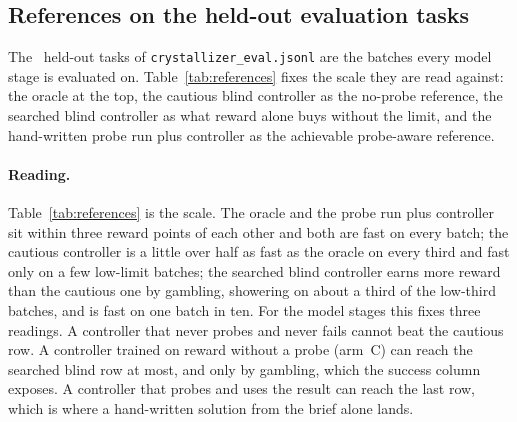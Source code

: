 \documentclass[11pt,a4paper]{article}
\begin{document}
\subsection{References on the held-out evaluation tasks}
\label{sec:references}

The \SZneval\ held-out tasks of \texttt{crystallizer\_eval.jsonl} are the
batches every model stage is evaluated on. Table~\ref{tab:references} fixes
the scale they are read against: the oracle at the top, the cautious blind
controller as the no-probe reference, the searched blind controller as what
reward alone buys without the limit, and the hand-written probe run plus
controller as the achievable probe-aware reference.

\begin{table}[h]
\centering\small
\resizebox{\linewidth}{!}{}
\caption{References on the held-out evaluation tasks, by third and overall.
}
\label{tab:references}
\end{table}

\paragraph{Reading.} Table~\ref{tab:references} is the scale. The oracle and
the probe run plus controller sit within three reward points of each other
and both are fast on every batch; the cautious controller is a little over
half as fast as the oracle on every third and fast only on a few low-limit
batches; the searched blind controller earns more reward than the cautious
one by gambling, showering on about a third of the low-third batches, and is
fast on one batch in ten. For the model stages this fixes three readings. A
controller that never probes and never fails cannot beat the cautious row. A
controller trained on reward without a probe (arm~C) can reach the searched
blind row at most, and only by gambling, which the success column exposes.
A controller that probes and uses the result can reach the last row, which
is where a hand-written solution from the brief alone lands.
\end{document}
